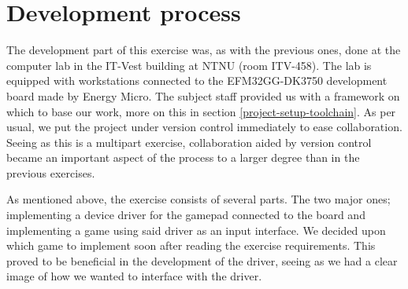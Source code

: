 \section{Development process}

The development part of this exercise was, as with the previous ones, done at the computer lab in the IT-Vest building at NTNU (room ITV-458). The lab is equipped with workstations connected to the EFM32GG-DK3750 development board made by Energy Micro.
The subject staff provided us with a framework on which to base our work, more on this in section \ref{project-setup-toolchain}.
As per usual, we put the project under version control immediately to ease collaboration. Seeing as this is a multipart exercise, collaboration aided by version control became an important aspect of the process to a larger degree than in the previous exercises.

As mentioned above, the exercise consists of several parts. The two major ones; implementing a device driver for the gamepad connected to the board and implementing a game using said driver as an input interface. We decided upon which game to implement soon after reading the exercise requirements. This proved to be beneficial in the development of the driver, seeing as we had a clear image of how we wanted to interface with the driver.



